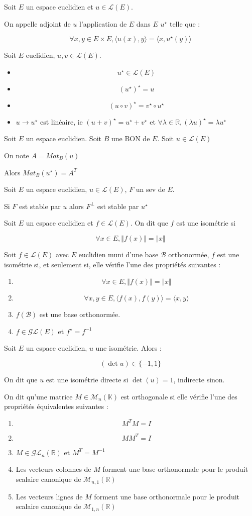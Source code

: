 \documentclass[a4paper,12pt]{book}
\newcommand{\Def}[2]{\begin{tcolorbox}[colback=white,colframe=red!10!green!20!blue!75!, title=Définition : #1]#2\end{tcolorbox}}
\newcommand{\Thr}[2]{\begin{tcolorbox}[sharp corners, colback=white,colframe=red!10!blue!30!green!75!, title=Théorème : #1]#2\end{tcolorbox}}
\def\R{\mathbb{R}}
\def\K{\mathbb{K}}
\begin{document}
\Def{Adjoint}{Soit $E$ un espace euclidien et $u\in\mathcal{L}(E)$.
\par On appelle adjoint de $u$ l'application de $E$ dans $E$ $u^\star$ telle que :
\par $$\forall x,y\in E\times E, \langle u(x), y \rangle = \langle x, u^\star(y)\rangle$$}
\Thr{Propriétés de l'ajdoint}{Soit $E$ euclidien, $u,v\in\mathcal{L}(E)$.\begin{itemize}
\item $$u^\star\in\mathcal{L}(E)$$
\item $$(u^\star)^\star = u$$
\item $$(u\circ v)^\star =v^\star \circ u^\star$$
\item $u\to u^\star$ est linéaire, ie $(u+v)^\star = u^\star + v^\star$ et $\forall \lambda\in\R, (\lambda u)^\star = \lambda u^\star$
\end{itemize}}
\Thr{}{Soit $E$ un espace euclidien. Soit $B$ une BON de $E$. Soit $u\in\mathcal{L}(E)$
\par On note $A = Mat_B(u)$
\par Alors $Mat_B(u^\star)= A^T$}
\Thr{}{Soit $E$ un espace euclidien, $u\in\mathcal{L}(E)$, $F$ un sev de $E$.
\par Si $F$ est stable par $u$ alors $F^\perp$ est stable par $u^\star$}
\Def{}{Soit $E$ un espace euclidien et $f\in\mathcal{L}(E)$. On dit que $f$ est une isométrie si
\par $$\forall x\in E, \Vert f(x)\Vert = \Vert x\Vert$$}
\Thr{Caractérisation}{Soit $f\in\mathcal{L}(E)$ avec $E$ euclidien muni d'une base $\mathcal{B}$ orthonormée, $f$ est une isométrie si, et seulement si, elle vérifie l'une des propriétés suivantes :\begin{enumerate}
\item $$\forall x\in E, \Vert f(x)\Vert=\Vert x\Vert$$
\item $$\forall x,y\in E, \langle f(x), f(y)\rangle = \langle x, y\rangle$$
\item $f(\mathcal{B})$ est une base orthonormée.
\item $f\in\mathcal{GL}(E)$ et $f^\star=f^{-1}$
\end{enumerate}}
\Thr{}{Soit $E$ un espace euclidien, $u$ une isométrie. Alors :
\par $$(\det u)\in \{-1, 1\}$$
\par On dit que $u$ est une isométrie directe si $\det(u)=1$, indirecte sinon.}
\Def{}{On dit qu'une matrice $M\in\mathcal{M}_n(\K)$ est orthogonale si elle vérifie l'une des propriétés équivalentes suivantes :\begin{enumerate}
\item $$M^TM = I$$
\item $$MM^T = I$$
\item $M\in\mathcal{GL}_n(\R)$ et $M^T=M^{-1}$
\item Les vecteurs colonnes de $M$ forment une base orthonormale pour le produit scalaire canonique de $\mathcal{M}_{n,1}(\R)$
\item Les vecteurs lignes de $M$ forment une base orthonormale pour le produit scalaire canonique de $\mathcal{M}_{1,n}(\R)$
\end{enumerate}}
\end{document}
